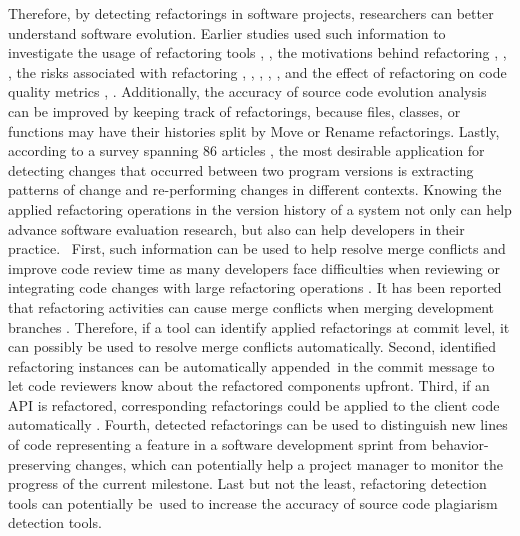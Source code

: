 \documentclass[letterpaper,12pt,onecolumn,final]{report}
\begin{document}
Therefore, by detecting refactorings in software projects, researchers can better understand software evolution. Earlier studies used such information to investigate the usage of refactoring tools  \cite{MurphyHill2012}, \cite{Negara2013}, the motivations behind refactoring \cite{kim2012field}, \cite{kim2014empirical}, \cite{Silva2016}, the risks associated with refactoring \cite{kim2012field}, \cite{kim2014empirical}, \cite{kim2011empirical}, \cite{weissgerber2006refactorings}, \cite{bavota2012does}, and the effect of refactoring on code quality metrics \cite{kim2012field}, \cite{kim2014empirical}. Additionally, the accuracy of source code evolution analysis can be improved by keeping track of refactorings, because files, classes, or functions may have their histories split by Move or Rename \cite{hora2018assessing} refactorings. Lastly, according to a survey spanning 86 articles \cite{soetens2017changes}, the most desirable application for detecting changes that occurred between two program versions is extracting patterns of change and re-performing changes in different contexts.
Knowing the applied refactoring operations in the version history of a system not only can help advance software evaluation research, but also can help developers in their practice.  First, such information can be used to help resolve merge conflicts and improve code review time as many developers face difficulties when reviewing or integrating code changes with large refactoring operations \cite{kim2012field}. It has been reported that refactoring activities can cause merge conflicts when merging development branches \cite{mahmoudi2019refactorings}. Therefore, if a tool can identify applied refactorings at commit level, it can possibly be used to resolve merge conflicts automatically. Second, identified refactoring instances can be automatically appended in the commit message to let code reviewers know about the refactored components upfront. Third, if an API is refactored, corresponding refactorings could be applied to the client code automatically \cite{henkel2005catchup} \cite{Xing2008}. Fourth, detected refactorings can be used to distinguish new lines of code representing a feature in a software development sprint from behavior-preserving changes, which can potentially help a project manager to monitor the progress of the current milestone. Last but not the least, refactoring detection tools can potentially be used to increase the accuracy of source code plagiarism detection tools.
\end{document}

